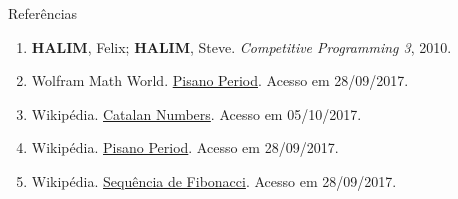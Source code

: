 \begin{frame}[fragile]{Referências}

    \begin{enumerate}
        \item \textbf{HALIM}, Felix; \textbf{HALIM}, Steve. \textit{Competitive Programming 3},
            2010.

        \item Wolfram Math World. \href{http://mathworld.wolfram.com/PisanoPeriod.html}{Pisano
            Period}. Acesso em 28/09/2017.

        \item Wikipédia. \href{https://en.wikipedia.org/wiki/Catalan_number}{Catalan Numbers}.
            Acesso em 05/10/2017.

        \item Wikipédia. \href{https://en.wikipedia.org/wiki/Pisano_period}{Pisano Period}. Acesso
            em 28/09/2017.

        \item Wikipédia. \href{https://pt.wikipedia.org/wiki/Sequência_de_Fibonacci}{Sequência de
            Fibonacci}. Acesso em 28/09/2017.
    \end{enumerate}

\end{frame}
